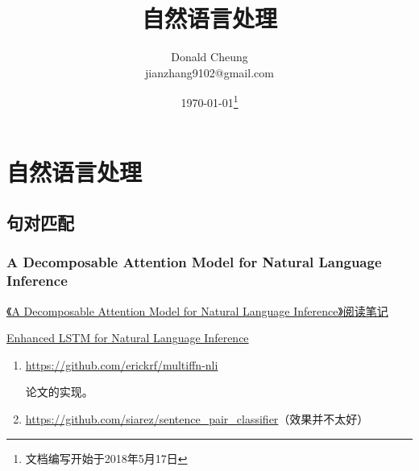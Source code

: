 \ifx\papersnotes\undefined
    \providecommand{\notesroot}{../..}
    \providecommand{\nlppapersroot}{.}

    \title{自然语言处理}
    \author{Donald Cheung\\jianzhang9102@gmail.com}
    \date{\today\footnote{文档编写开始于2018年5月17日}}

    
\else
    \providecommand{\nlppapersroot}{\papersroot/nlp}
\fi

\chapter{自然语言处理}

\section{句对匹配}

\subsection{A Decomposable Attention Model for Natural Language Inference \cite{Parikh:2016aa}}

\href{https://zhuanlan.zhihu.com/p/26237357}{《A Decomposable Attention Model for Natural Language Inference》阅读笔记}


\href{https://arxiv.org/pdf/1609.06038.pdf}{Enhanced LSTM for Natural Language Inference}

\begin{enumerate}
    \item \url{https://github.com/erickrf/multiffn-nli}

        论文的实现。

    \item \url{https://github.com/siarez/sentence_pair_classifier}（效果并不太好）
\end{enumerate}

\ifx\papersnotes\undefined
    
\fi
